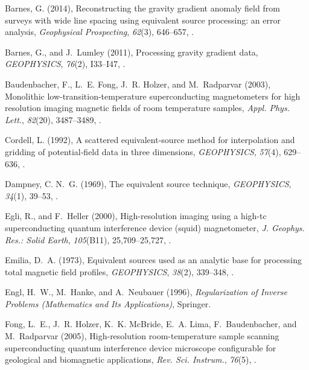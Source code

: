 \documentclass[galley,gc]{agutex}
\begin{document}
\begin{article}
\begin{thebibliography}{40}
Barnes, G. (2014), Reconstructing the gravity gradient anomaly field from
  surveys with wide line spacing using equivalent source processing: an error
  analysis, \textit{Geophysical Prospecting}, \textit{62}(3), 646--657,
  .

Barnes, G., and J.~Lumley (2011), Processing gravity gradient data,
  \textit{GEOPHYSICS}, \textit{76}(2), I33--I47, .

Baudenbacher, F., L.~E. Fong, J.~R. Holzer, and M.~Radparvar (2003), Monolithic
  low-transition-temperature superconducting magnetometers for high resolution
  imaging magnetic fields of room temperature samples, \textit{Appl. Phys.
  Lett.}, \textit{82}(20), 3487--3489,
  .

Cordell, L. (1992), A scattered equivalent-source method for interpolation and
  gridding of potential‐field data in three dimensions, \textit{GEOPHYSICS},
  \textit{57}(4), 629--636, .

Dampney, C. N.~G. (1969), The equivalent source technique, \textit{GEOPHYSICS},
  \textit{34}(1), 39--53, .

Egli, R., and F.~Heller (2000), High-resolution imaging using a high-tc
  superconducting quantum interference device (squid) magnetometer, \textit{J.
  Geophys. Res.: Solid Earth}, \textit{105}(B11), 25,709--25,727,
  .

Emilia, D.~A. (1973), Equivalent sources used as an analytic base for
  processing total magnetic field profiles, \textit{GEOPHYSICS},
  \textit{38}(2), 339--348, .

Engl, H.~W., M.~Hanke, and A.~Neubauer (1996), \textit{Regularization of
  Inverse Problems (Mathematics and Its Applications)}, Springer.

Fong, L.~E., J.~R. Holzer, K.~K. McBride, E.~A. Lima, F.~Baudenbacher, and
  M.~Radparvar (2005), High-resolution room-temperature sample scanning
  superconducting quantum interference device microscope configurable for
  geological and biomagnetic applications, \textit{Rev. Sci. Instrum.},
  \textit{76}(5), .


\end{thebibliography}
\end{article}
\end{document}
